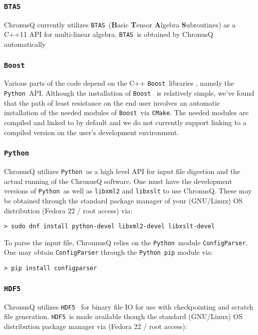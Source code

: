 \documentclass[12pt]{article}
\newcommand{\CMake}{\texttt{CMake}}
\newcommand{\BTAS}{\texttt{BTAS}}
\newcommand{\Boost}{\texttt{Boost}}
\newcommand{\HDF}{\texttt{HDF5}}
\newcommand{\Python}{\texttt{Python}}
\newcounter{subsubsubsection}[subsubsection]
\begin{document}
      \subsubsection{\BTAS} \label{subsubsec:BTAS}
        ChronusQ currently utilizes \BTAS~(\textbf{B}asic \textbf{T}ensor
        \textbf{A}lgebra \textbf{S}ubroutines) \cite{btas} as a C++11 API for multi-linear 
	algebra. \BTAS~is obtained by ChronusQ automatically

      \subsubsection{\Boost} \label{subsubsec:boost} 
        Various parts of the code depend on the C++ \Boost~libraries \cite{boost},
	namely the \Python~API.
	Although the installation of \Boost~ is relatively simple, we've found that
	the path of least resistance on the end user involves an automatic installation
	of the needed modules of \Boost~via \CMake. The needed modules are compiled
	and linked to by default and we do not currently support linking to a compiled
	version on the user's development environment.

      \subsubsection{\Python} \label{subsubsec:Python} 
        ChronusQ utilizes \Python~as a high level API for input
        file digestion and the actual running of the ChronusQ software. One
	must have the development versions of \Python~as well as \texttt{libxml2} 
	and \texttt{libxslt} to use ChronusQ. These may be obtained through the 
	standard package manager of your (GNU/Linux) OS distribution (Fedora 22 /
	root access) via:

	\begin{lstlisting}
> sudo dnf install python-devel libxml2-devel libxslt-devel
	\end{lstlisting}

         \label{subsubsubsec:CP}
        \noindent To parse the input file, ChrounusQ relies on the \Python~module 
	\texttt{ConfigParser}. One may obtain \texttt{ConfigParser} through
	the \Python~\texttt{pip} module via:
	 
	\begin{lstlisting}
> pip install configparser
	\end{lstlisting}

      \subsubsection{\HDF} \label{subsubsec:HDF5} 
        ChronusQ utilizes \HDF~\cite{hdf5} for binary file IO for use with 
        checkpointing and scratch file generation. \HDF~is made available
	though the standard (GNU/Linux) OS distribution package manager via
	(Fedora 22 / root access):
\end{document}
